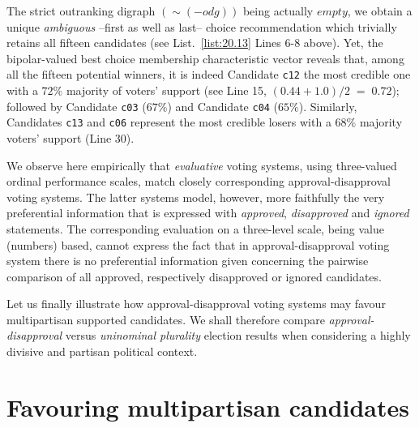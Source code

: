 The strict outranking digraph $(\sim (-odg))$ being actually $empty$, we obtain a unique \emph{ambiguous} --first as well as last-- choice recommendation which trivially retains all fifteen candidates (see List.~\vref{list:20.13} Lines 6-8 above). Yet, the bipolar-valued best choice membership characteristic vector reveals that, among all the fifteen potential winners, it is indeed Candidate \texttt{c12} the most credible one with a $72\%$ majority of voters' support (see Line 15, $(0.44 + 1.0)/2\;=\; 0.72$); followed by Candidate \texttt{c03} ($67\%$) and Candidate \texttt{c04} ($65\%$). Similarly, Candidates \texttt{c13} and \texttt{c06} represent the most credible losers with a $68\%$ majority voters' support (Line 30).

We observe here empirically that \emph{evaluative} voting systems, using three-valued ordinal performance scales, match closely corresponding approval-disapproval voting systems. The latter systems model, however, more faithfully the very preferential information that is expressed with \emph{approved}, \emph{disapproved} and \emph{ignored} statements. The corresponding evaluation on a three-level scale, being value (numbers) based, cannot express the fact that in approval-disapproval voting system there is no preferential information given concerning the pairwise comparison of all approved, respectively disapproved or ignored candidates.

Let us finally illustrate how approval-disapproval voting systems may favour multipartisan supported candidates. We shall therefore compare \emph{approval-disapproval} versus \emph{uninominal plurality} election results when considering a highly divisive and partisan political context.
 
\section{Favouring multipartisan candidates}
\label{sec:20.5}

